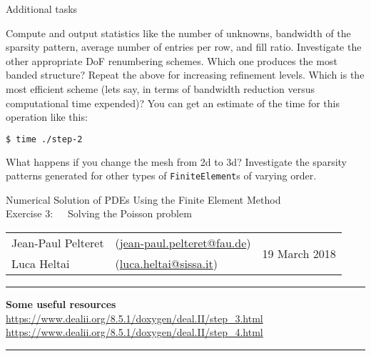\documentclass[11pt]{exam}
\makeatletter
\newcommand{\makeheader}[3]{%
\setcounter{question}{0}
\begin{center}
{\sc Numerical Solution of PDEs Using the Finite Element Method}\vspace{2ex}\\
{\sc Exercise #1:\ \ \ #2}\vspace{2ex}\\
\begin{tabular*}{\textwidth}{ll @{\extracolsep{\fill}}r}
Jean-Paul Pelteret & (\url{jean-paul.pelteret@fau.de}) & \multirow{2}{*}{#3} \\
Luca Heltai & (\url{luca.heltai@sissa.it}) & \\
\end{tabular*}
\end{center}
}
\newcommand{\makeresources}[1]{%
\rule{\textwidth}{0.6mm}
\textbf{Some useful resources}\\[1.5ex]
#1 \par
\rule{\textwidth}{0.6mm}
}
\makeatother
\begin{document}
\begin{questions}

\question Additional tasks
\begin{parts}
\bonuspart Compute and output statistics like the number of unknowns, bandwidth of the sparsity pattern, average number of entries per row, and fill ratio.
\bonuspart Investigate the other appropriate DoF renumbering schemes. Which one produces the most banded structure?
\bonuspart Repeat the above for increasing refinement levels. Which is the most efficient scheme (lets say, in terms of bandwidth reduction versus computational time expended)?  You can get an estimate of the time for this operation like this:
\begin{lstlisting}[language=bash]
$ time ./step-2
\end{lstlisting}
\bonuspart What happens if you change the mesh from 2d to 3d?
\bonuspart Investigate the sparsity patterns generated for other types of \verb|FiniteElement|s of varying order.
\end{parts}

\end{questions}




\clearpage
\makeheader{3}{Solving the Poisson problem}{19 March 2018}
\makeresources{%
\url{https://www.dealii.org/8.5.1/doxygen/deal.II/step_3.html} \\
\url{https://www.dealii.org/8.5.1/doxygen/deal.II/step_4.html}
}
\end{document}
